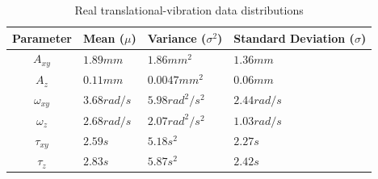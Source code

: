 \begin{table}[H]
    \centering
\begin{tabular}{| c | L | L | L |}

    \hline
    
     \textbf{Parameter}  & 
     \textbf{Mean ($ \mu $)} & 
     \textbf{Variance ($ \sigma^{2} $)} &
     \textbf{Standard Deviation ($ \sigma $)} \\
     \hline
     
     $ A_{xy} $ & 
     $ 1.89 mm $ & 
     $ 1.86 mm^{2} $ &
     $ 1.36 mm $ \\

      
     $ A_{z} $  & 
     $ 0.11 mm $ & 
     $ 0.0047 mm^{2} $ &
     $ 0.06 mm $ \\
     
     
     $ \omega_{xy} $ & 
     $ 3.68 rad/s $ & 
     $ 5.98 rad^{2}/s^{2} $ &
     $ 2.44 rad/s $ \\
     
     
     $ \omega_{z} $& 
     $ 2.68 rad/s $ & 
     $ 2.07 rad^{2}/s^{2} $ &
     $ 1.03 rad/s $ \\

     
     $ \tau_{xy} $ & 
     $ 2.59 s $ & 
     $ 5.18 s^{2} $ &
     $ 2.27 s $ \\


     $ \tau_{z} $ & 
     $ 2.83 s $ & 
     $ 5.87 s^{2} $ &
     $ 2.42 s $ \\

    \hline

\end{tabular}
    \caption{Real translational-vibration data distributions}
    \label{tab:real_data_analysis_displacement}
\end{table}

